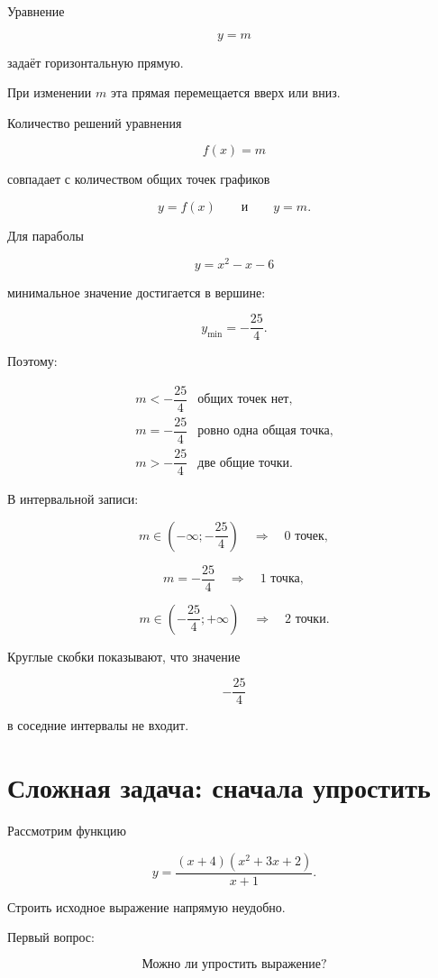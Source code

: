 \documentclass[a4paper,12pt]{article}
\begin{document}
Уравнение

\[
\boxed{y=m}
\]

задаёт горизонтальную прямую.

При изменении \(m\) эта прямая перемещается вверх или вниз.

Количество решений уравнения

\[
f(x)=m
\]

совпадает с количеством общих точек графиков

\[
y=f(x)
\qquad\text{и}\qquad
y=m.
\]

Для параболы

\[
y=x^2-x-6
\]

минимальное значение достигается в вершине:

\[
y_{\min}=-\frac{25}{4}.
\]

Поэтому:

\[
\boxed{
\begin{array}{ll}
m<-\dfrac{25}{4}
&
\text{общих точек нет},
\\[3mm]
m=-\dfrac{25}{4}
&
\text{ровно одна общая точка},
\\[3mm]
m>-\dfrac{25}{4}
&
\text{две общие точки}.
\end{array}
}
\]

В интервальной записи:

\[
m\in
\left(-\infty;-\frac{25}{4}\right)
\quad\Longrightarrow\quad
0\text{ точек},
\]

\[
m=-\frac{25}{4}
\quad\Longrightarrow\quad
1\text{ точка},
\]

\[
m\in
\left(-\frac{25}{4};+\infty\right)
\quad\Longrightarrow\quad
2\text{ точки}.
\]

Круглые скобки показывают, что значение

\[
-\frac{25}{4}
\]

в соседние интервалы не входит.

\section{Сложная задача: сначала упростить}

Рассмотрим функцию

\[
\boxed{
y=
\frac{(x+4)(x^2+3x+2)}{x+1}
}.
\]

Строить исходное выражение напрямую неудобно.

Первый вопрос:

\[
\boxed{\text{Можно ли упростить выражение?}}
\]
\end{document}
